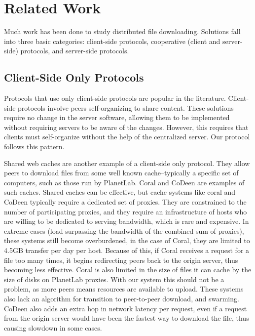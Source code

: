 \section{Related Work}\label{section:related_work}
Much work has been done to study distributed file downloading.  Solutions fall into three basic categories: client-side protocols, cooperative (client and server-side) protocols, 
and server-side protocols.

\subsection{Client-Side Only Protocols}
Protocols that use only client-side protocols are popular in the literature.  Client-side protocols involve peers self-organizing to share content.  
These solutions require no change in the server software, allowing them to be implemented without requiring servers to be aware of the changes.  However, 
this requires that clients must self-organize without the help of the centralized server.  Our protocol follows this pattern.

Shared web caches are another example of a client-side only protocol.  They allow peers to download files from some well known cache--typically a specific 
set of computers, such as those run by PlanetLab.  Coral \cite{coral} and CoDeen \cite{codeen} are examples of such caches.  Shared caches can be effective, but
cache systems like coral and CoDeen typically require a dedicated set of proxies.  They are constrained to the number of participating proxies, and they 
require an infrastructure of hosts who are willing to be dedicated to serving bandwidth, which is rare and expensive.  
In extreme cases (load surpassing the bandwidth of the combined sum of proxies), these systems still become overburdened, in the case of Coral, they are
limited to 4.5GB transfer per day per host.  Because of this, if Coral receives a request for a file too many times, it begins redirecting peers back to 
the origin server, thus becoming less effective.  Coral is also limited in the size of files it can cache by the size of disks on PlanetLab proxies.  
With our system this should not be a problem, as more peers means resources are available to upload.  These systems also lack an algorithm for transition 
to peer-to-peer download, and swarming.  CoDeen also adds an extra hop in network latency per request, even if a request from the origin server would have 
been the fastest way to download the file, thus causing slowdown in some cases.

